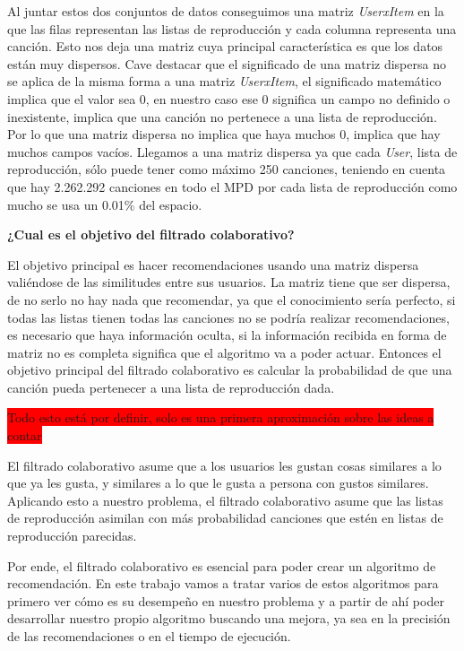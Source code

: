 \documentclass{article}
\begin{document}
Al juntar estos dos conjuntos de datos conseguimos una matriz \textit{UserxItem} en la que las filas representan las listas de reproducción y cada columna representa una canción. Esto nos deja una matriz cuya principal característica es que los datos están muy dispersos. Cave destacar que el significado de una matriz dispersa no se aplica de la misma forma a una matriz \textit{UserxItem}, el significado matemático implica que el valor sea 0, en nuestro caso ese 0 significa un campo no definido o inexistente, implica que una canción no pertenece a una lista de reproducción. Por lo que una matriz dispersa no implica que haya muchos 0, implica que hay muchos campos vacíos. Llegamos a una matriz dispersa ya que cada \textit{User}, lista de reproducción, sólo puede tener como máximo 250 canciones, teniendo en cuenta que hay 2.262.292 canciones en todo el MPD  por cada lista de reproducción como mucho se usa un 0.01\% del espacio.


\bigskip
\textbf{¿Cual es el objetivo del filtrado colaborativo?}
\bigskip

El objetivo principal es hacer recomendaciones usando una matriz dispersa valiéndose de las similitudes entre sus usuarios. La matriz tiene que ser dispersa, de no serlo no hay nada que recomendar, ya que el conocimiento sería perfecto, si todas las listas tienen todas las canciones no se podría realizar recomendaciones, es necesario que haya información oculta, si la información recibida en forma de matriz no es completa significa que el algoritmo va a poder actuar.
Entonces el objetivo principal del filtrado colaborativo es calcular la probabilidad de que una canción pueda pertenecer a una lista de reproducción dada.

\bigskip
\colorbox{red}{Todo esto está por definir, solo es una primera aproximación sobre las ideas a contar}

\bigskip

El filtrado colaborativo asume que a los usuarios les gustan cosas similares a lo que ya les gusta, y similares a lo que le gusta a persona con gustos similares. Aplicando esto a nuestro problema, el filtrado colaborativo asume que las listas de reproducción asimilan con más probabilidad canciones que estén en listas de reproducción parecidas.


\bigskip
Por ende, el filtrado colaborativo es esencial para poder crear un algoritmo de recomendación.
En este trabajo vamos a tratar varios de estos algoritmos para primero ver cómo es su desempeño en nuestro problema y a partir de ahí poder desarrollar nuestro propio algoritmo buscando una mejora, ya sea en la precisión de las recomendaciones o en el tiempo de ejecución.
\end{document}

